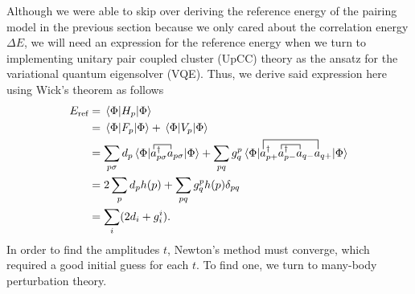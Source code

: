 \documentclass[10pt]{article}
\begin{document}
Although we were able to skip over deriving the reference energy of the pairing model in the previous section because we only cared about the correlation energy $\Delta E$, we will need an expression for the reference energy when we turn to implementing unitary pair coupled cluster (UpCC) theory as the ansatz for the variational quantum eigensolver (VQE). Thus, we derive said expression here using Wick's theorem as follows
\begin{align}
E_{\text{ref}}
&=
\mel{\Phi}{H_p}{\Phi}
\nonumber
\\
&=
\mel*{\Phi}{F_p}{\Phi}
+
\mel{\Phi}{V_p}{\Phi}
\nonumber
\\
&=
\sum_{p\sigma}d_p\mel{\Phi}{
\contraction{}{a}{^\dagger_{p\sigma}}{a}
{a^\dagger_{p\sigma}a_{p\sigma}}
}{\Phi}
+
\sum_{pq}g_q^p\mel{\Phi}{
\contraction[1ex]{a^\dagger_{p+}}{a}{^\dagger_{p-}}{a}
\contraction[2ex]{}{a}{^\dagger_{p+}a^\dagger_{p-}a_{q-}}{a}
a^\dagger_{p+}a^\dagger_{p-}a_{q-}a_{q+}
}{\Phi}
\nonumber
\\
&=
2\sum_pd_ph(p)+\sum_{pq}g_q^ph(p)\delta_{pq}
\nonumber
\\
&=
\sum_i(2d_i+g_i^i)
.\end{align}
In order to find the amplitudes $t$, Newton's method must converge, which required a good initial guess for each $t$. To find one, we turn to many-body perturbation theory.
\end{document}
